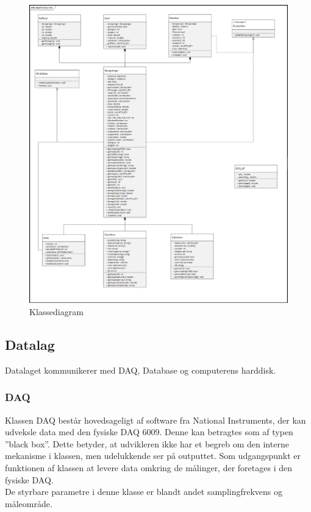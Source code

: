 \begin{figure}[H]
	\centering
	\includegraphics[width=1\textwidth]{Figurer/classdiagram}
	\caption{Klassediagram}
\end{figure}

\subsection{Datalag}
Datalaget kommunikerer med DAQ, Database og computerens harddisk. 

\subsubsection{DAQ}
Klassen DAQ består hovedsageligt af software fra National Instruments, der kan udveksle data med den fysiske DAQ 6009. Denne kan betragtes som af typen ”black box”. Dette betyder, at udvikleren ikke har et begreb om den interne mekanisme i klassen, men udelukkende ser på outputtet. Som udgangspunkt er funktionen af klassen at levere data omkring de målinger, der foretages i den fysiske DAQ.\\
De styrbare parametre i denne klasse er blandt andet samplingfrekvens og måleområde. 

